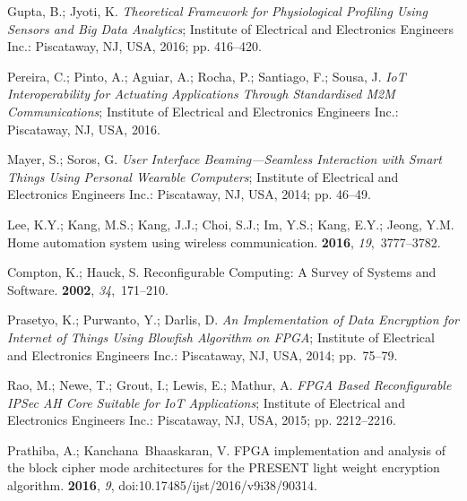 \documentclass[symmetry,article,accept,moreauthors,pdftex10pt,a4paper]{mdpi}
\begin{document}
\begin{thebibliography}{999}
Gupta, B.; Jyoti, K.
\newblock \emph{Theoretical Framework for Physiological Profiling Using Sensors and
	Big Data Analytics};
\newblock Institute of Electrical and Electronics Engineers Inc.: Piscataway, NJ, USA, 2016; pp.
416--420.

Pereira, C.; Pinto, A.; Aguiar, A.; Rocha, P.; Santiago, F.; Sousa, J.
\newblock \emph{IoT Interoperability for Actuating Applications Through Standardised
	M2M Communications};
\newblock Institute of Electrical and Electronics Engineers Inc.: Piscataway, NJ, USA, 2016.

Mayer, S.; Soros, G.
\newblock \emph{User Interface Beaming---Seamless Interaction with Smart Things Using
	Personal Wearable Computers};
\newblock Institute of Electrical and Electronics Engineers Inc.: Piscataway, NJ, USA, 2014; pp.
46--49.

Lee, K.Y.; Kang, M.S.; Kang, J.J.; Choi, S.J.; Im, Y.S.; Kang, E.Y.; Jeong,
Y.M.
\newblock Home automation system using wireless communication.
 {\bf 2016}, {\em 19},~3777--3782.

Compton, K.; Hauck, S.
\newblock Reconfigurable Computing: A Survey of Systems and Software.
 {\bf 2002}, {\em 34},~171--210.

Prasetyo, K.; Purwanto, Y.; Darlis, D.
\newblock \emph{An Implementation of Data Encryption for Internet of Things Using
	Blowfish Algorithm on FPGA};
\newblock Institute of Electrical and Electronics Engineers Inc.: Piscataway, NJ, USA, 2014; pp.~75--79.

Rao, M.; Newe, T.; Grout, I.; Lewis, E.; Mathur, A.
\newblock \emph{FPGA Based Reconfigurable IPSec AH Core Suitable for IoT
	Applications};
\newblock Institute of Electrical and Electronics Engineers Inc.: Piscataway, NJ, USA, 2015; pp.
2212--2216.

Prathiba, A.; Kanchana~Bhaaskaran, V.
\newblock FPGA implementation and analysis of the block cipher mode
architectures for the PRESENT light weight encryption algorithm.
 {\bf 2016}, {\em 9}, doi:10.17485/ijst/2016/v9i38/90314.


\end{thebibliography}
\end{document}

